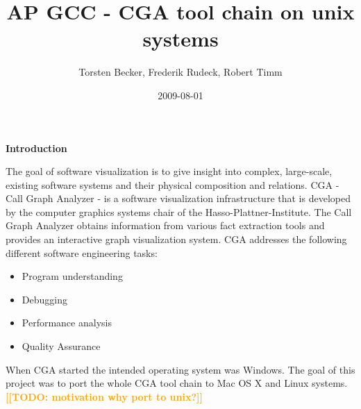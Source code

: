 \documentclass[a4paper]{article}
\title{AP GCC - CGA tool chain on unix systems}
\author{ Torsten Becker, Frederik Rudeck, Robert Timm }
\date{2009-08-01}
\newcommand{\todo}[1]{\textsf{\textbf{\textcolor{Orange}{[[#1]]}}}}
\begin{document}
\lstset{language=C++}

\ifpdf {} \else {} \fi

\maketitle

\begin{large}
\textbf{Introduction}\\	
\end{large}

The goal of software visualization is to give insight into complex, large-scale, existing software systems and their physical composition and relations. CGA - Call Graph Analyzer - is a software visualization infrastructure that is developed by the computer graphics systems chair of the Hasso-Plattner-Institute. The Call Graph Analyzer obtains information from various fact extraction tools and provides an interactive graph visualization system. CGA addresses the following different software engineering tasks:

\begin{itemize}
	\item Program understanding
	\item Debugging
	\item Performance analysis
	\item Quality Assurance
\end{itemize}

When CGA started the intended operating system was Windows. The goal of this project was to port the whole CGA tool chain to Mac OS X and Linux systems. \todo{TODO: motivation why port to unix?}
\newpage

\tableofcontents
\newpage


\setlength{\parskip}{0.27cm}


 

\newpage

 

\newpage

 

\newpage

 

\newpage

 

\newpage

 

\newpage

 

\newpage

 

 

\end{document}
